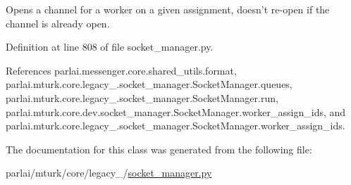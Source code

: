 \begin{DoxyVerb}Opens a channel for a worker on a given assignment, doesn't re-open
if the channel is already open.\end{DoxyVerb}
 

Definition at line 808 of file socket\+\_\+manager.\+py.



References parlai.\+messenger.\+core.\+shared\+\_\+utils.\+format, parlai.\+mturk.\+core.\+legacy\+\_.\+socket\+\_\+manager.\+Socket\+Manager.\+queues, parlai.\+mturk.\+core.\+legacy\+\_.\+socket\+\_\+manager.\+Socket\+Manager.\+run, parlai.\+mturk.\+core.\+dev.\+socket\+\_\+manager.\+Socket\+Manager.\+worker\+\_\+assign\+\_\+ids, and parlai.\+mturk.\+core.\+legacy\+\_.\+socket\+\_\+manager.\+Socket\+Manager.\+worker\+\_\+assign\+\_\+ids.



The documentation for this class was generated from the following file\+:\begin{DoxyCompactItemize}
\item 
parlai/mturk/core/legacy\+\_/\hyperlink{legacy__2018_2socket__manager_8py}{socket\+\_\+manager.\+py}\end{DoxyCompactItemize}
